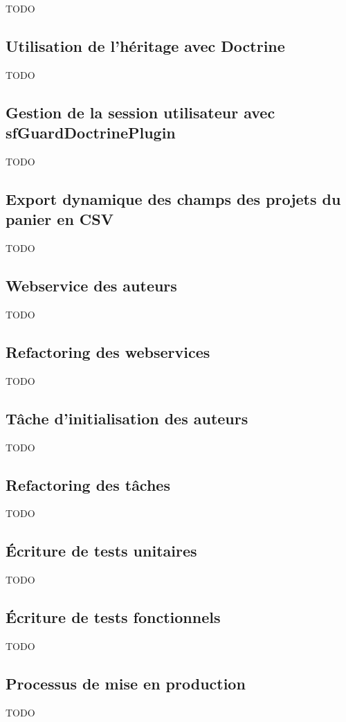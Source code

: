 TODO





\subsection{Utilisation de l'héritage avec Doctrine}

TODO

\subsection{Gestion de la session utilisateur avec sfGuardDoctrinePlugin}

TODO

\subsection{Export dynamique des champs des projets du panier en CSV}

TODO

\subsection{Webservice des auteurs}

TODO

\subsection{Refactoring des webservices}

TODO

\subsection{Tâche d'initialisation des auteurs}

TODO

\subsection{Refactoring des tâches}

TODO

\subsection{Écriture de tests unitaires}

TODO

\subsection{Écriture de tests fonctionnels}

TODO

\subsection{Processus de mise en production}

TODO
